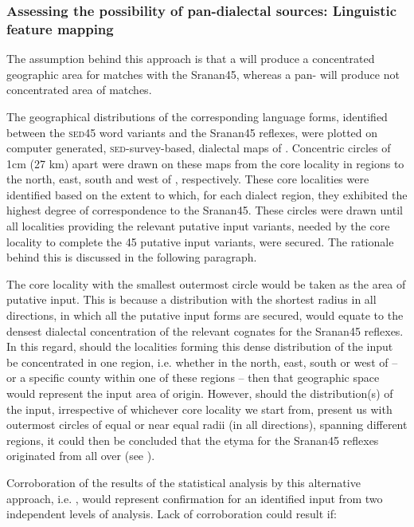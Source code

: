 {{{\subsubsection{Assessing the possibility of pan-dialectal sources: Linguistic feature mapping} \label{3.4.4.1}
The assumption behind this approach is that a  will produce a concentrated geographic area for matches with the Sranan45, whereas a pan- will produce not concentrated area of matches.

The geographical distributions of the corresponding language forms, identified between the \textsc{sed45} word variants and the  Sranan45 reflexes, were plotted on computer generated, \textsc{sed}-survey-based, dialectal maps of . Concentric circles of 1cm (27 km) apart were drawn on these maps from the core locality in regions to the north, east, south and west of , respectively. These core localities were identified based on the extent to which, for each dialect region, they exhibited the highest degree of correspondence to the Sranan45. These circles were drawn until all localities providing the relevant putative input variants, needed by the core locality to complete the 45 putative input variants, were secured. The rationale behind this is discussed in the following paragraph.

The core locality with the smallest outermost circle would be taken as the area of putative input. This is because a distribution with the shortest radius in all directions, in which all the putative input forms are secured, would equate to the densest dialectal concentration of the relevant cognates for the  Sranan45 reflexes. In this regard, should the localities forming this dense distribution of the input be concentrated in one region, i.e. whether in the north, east, south or west of  -- or a specific county within one of these regions -- then that geographic space would represent the input area of origin. However, should the distribution(s) of the input, irrespective of whichever core locality we start from, present us with outermost circles of equal or near equal radii (in all directions), spanning different regions, it could then be concluded that the etyma for the Sranan45 reflexes originated from all over  (see ).

Corroboration of the results of the statistical analysis by this alternative approach, i.e. , would represent confirmation for an identified input from two independent levels of analysis. Lack of corroboration could result if:

}}}
